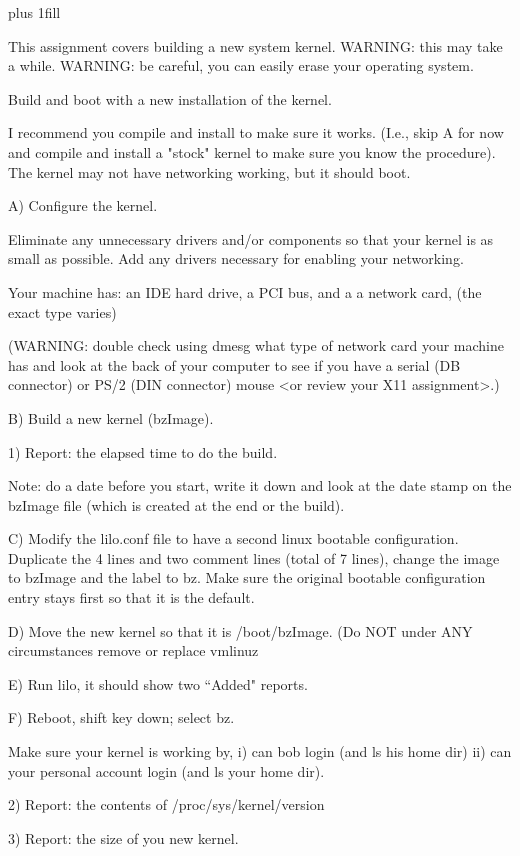 
\rightskip=0pt plus 1fill

\parindent 0pt

This assignment covers building a new system kernel.
WARNING: this may take a while.
WARNING: be careful, you can easily erase your operating system.

Build and boot with a new installation of the kernel.


I recommend you compile and install to make sure it works.
(I.e., skip A for now and compile and install a "stock" kernel to
make sure you know the procedure).
The kernel may not have networking working, but it should boot.

A) Configure the kernel. 

Eliminate any unnecessary drivers and/or components so that your kernel is
as small as possible.
Add any drivers necessary for enabling your networking.

Your machine has:
an IDE hard drive, a PCI bus,
and a
a network card, (the exact type varies)

(WARNING: double check using dmesg what type of network card your
machine has and look at the back of your computer to see
if you have a serial (DB connector) or PS/2 (DIN connector) mouse 
<or review your X11 assignment>.)

B) Build a new kernel ({\ltt{}bzImage}).

1) Report: the elapsed time to do the build.

Note: do a date before you start, write it down and look at
the date stamp on the {\ltt{}bzImage} file (which is created at
the end or the build).

C) Modify the {\ltt{}lilo.conf} file to have a second linux
bootable configuration.
Duplicate the 4 lines and two comment lines (total of 7 lines),
change the image to {\ltt{}bzImage} and the label to {\ltt{}bz}.
Make sure the original bootable configuration entry stays first so that
it is the default.

D) Move the new kernel so that it is {\ltt{}/boot/bzImage}.
(Do NOT under ANY circumstances remove or replace {\ltt{}vmlinuz}

E) Run lilo, it should show two ``Added" reports.

F) Reboot, shift key down; select bz.

Make sure your kernel is working by,
i) can bob login (and ls his home dir)
ii) can your personal account login (and ls your home dir). 

2) Report: the contents of {\ltt{}/proc/sys/kernel/version} 

3) Report: the size of you new kernel.

\bye
